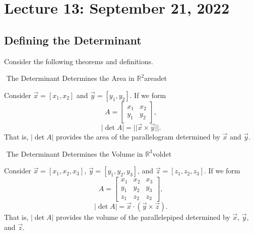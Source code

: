 \section{Lecture 13: September 21, 2022}

    \subsection{Defining the Determinant}

        Consider the following theorems and definitions.
        \begin{theorem}{\Stop\,\,The Determinant Determines the Area in \(\mathbb{R}^2\)}{areadet}

            Consider \(\vec{x}=[x_1,x_2]\) and \(\vec{y}=[y_1,y_2]\). If we form
            \begin{equation*}
                A=\begin{bmatrix}
                    x_1 & x_2 \\
                    y_1 & y_2 
                \end{bmatrix},
            \end{equation*}
            \begin{equation*}
                |\det A| = ||\vec{x}\times\vec{y}||.
            \end{equation*}
            That is, \(|\det A|\) provides the area of the parallelogram determined by \(\vec{x}\) and \(\vec{y}\).
            
        \end{theorem}
        \begin{theorem}{\Stop\,\,The Determinant Determines the Volume in \(\mathbb{R}^3\)}{voldet}

            Consider \(\vec{x}=[x_1,x_2,x_3]\), \(\vec{y}=[y_1,y_2,y_3]\), and \(\vec{z}=[z_1,z_2,z_3]\).
            If we form
            \begin{equation*}
                A=\begin{bmatrix}
                    x_1 & x_2 & x_3 \\
                    y_1 & y_2 & y_3 \\
                    z_1 & z_2 & z_3
                \end{bmatrix},
            \end{equation*}
            \begin{equation*}
                |\det A| = \vec{x}\cdot(\vec{y}\times\vec{z}).
            \end{equation*}
            That is, \(|\det A|\) provides the volume of the parallelepiped determined by \(\vec{x}\), \(\vec{y}\), and \(\vec{z}\).
            
        \end{theorem}
